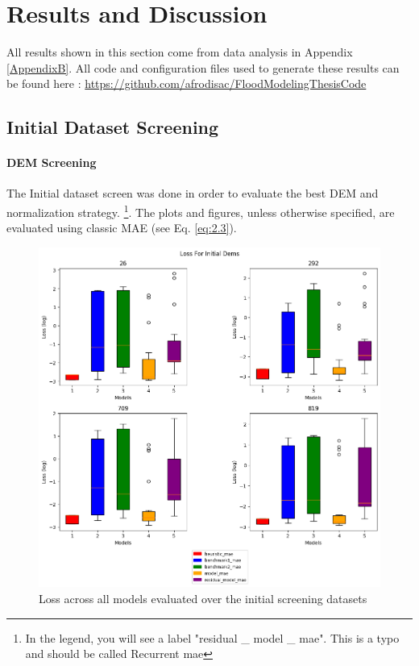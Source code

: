 
\chapter{Results and Discussion} %
\label{Chapter5} %
All results shown in this section come from data analysis in Appendix \ref{AppendixB}. All code and configuration files used to generate these results can be found here : \url{https://github.com/afrodisac/FloodModelingThesisCode}

\section{Initial Dataset Screening}
\subsubsection*{DEM Screening}
The Initial dataset screen was done in order to evaluate the best DEM and normalization strategy. \footnote{In the legend, you will see a label "residual \_ model \_ mae". This is a typo and should be called Recurrent mae}. The plots and figures, unless otherwise specified, are evaluated using classic MAE (see Eq. \ref{eq:2.3}). 

\begin{figure}[htbp]
	\centering
	\includegraphics[width=0.9\linewidth, height=0.7\linewidth]{"Figures/Results/Initial screening/DEM screening plots/Box_Plot"}
	\caption[Loss over all DEMs]{Loss across all models evaluated over the initial screening datasets}
	\label{fig:dem-screening}
\end{figure}

